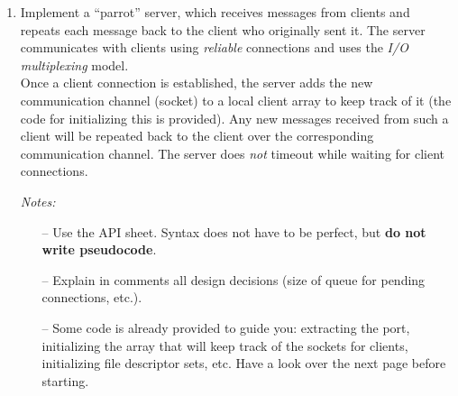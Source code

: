 \documentclass[11pt]{article}
\begin{document}
\begin{enumerate}
	\newpage
	\item Implement a “parrot” server, which receives messages from clients and repeats each message back to the client who originally sent it. The server communicates with clients using \textit{reliable} connections and uses the \textit{I/O multiplexing} model.\\
	Once a client connection is established, the server adds the new communication channel (socket) to a local client array to keep track of it (the code for initializing this is provided). Any new messages received from such a client will be repeated back to the client over the corresponding communication channel. The server does \textit{not} timeout while waiting for client connections.

	\textit{Notes:} \begin{itemize}
			\item[--]  Use the API sheet. Syntax does not have to be perfect, but \textbf{do not write pseudocode}.
			\item[--] Explain in comments all design decisions (size of queue for pending connections, etc.).
			\item[--] Some code is already provided to guide you: extracting the port, initializing the array that will keep track of the sockets for clients, initializing file descriptor sets, etc. Have a look over the next page before starting.
		\end{itemize}
		
\end{enumerate}
\end{document}
